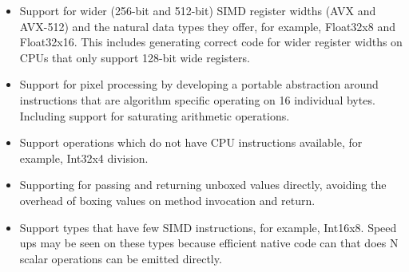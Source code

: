\documentclass[preprint]{sigplanconf}
\begin{document}
\begin{itemize} 
\item
Support for wider (256-bit and 512-bit) SIMD register widths (AVX and AVX-512)
and the natural data types they offer, for example, Float32x8 and Float32x16.
This includes generating correct code for wider register widths on CPUs that
only support 128-bit wide registers.

\item
Support for pixel processing by developing a portable abstraction around
instructions that are algorithm specific operating on 16 individual bytes.
Including support for saturating arithmetic operations.

\item
Support operations which do not have CPU instructions available, for example,
Int32x4 division.

\item
Supporting for passing and returning unboxed values directly, avoiding the
overhead of boxing values on method invocation and return.

\item
Support types that have few SIMD instructions, for example, Int16x8. Speed ups
may be seen on these types because efficient native code can that does N scalar
operations can be emitted directly.
\end{itemize}



\end{document}
